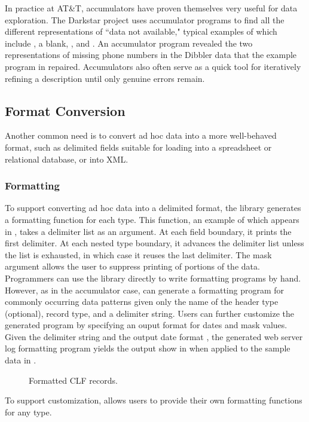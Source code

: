 \documentclass{sig-alternate}
\begin{document}
In practice at AT\&T, accumulators have proven themselves very useful for
data exploration.  The Darkstar project uses \pads{} accumulator programs
to find all the different representations of ``data not available,"  typical 
examples of which include , a blank, , and .
An accumulator program revealed the two representations
of missing phone numbers in the Dibbler data that the example program
in  repaired.
Accumulators also often serve as a quick tool for iteratively
refining a \pads{} description until only genuine errors remain.

\subsection{Format Conversion}
Another common need is to convert ad hoc data into a more well-behaved format, such as delimited fields suitable for loading into a spreadsheet or relational database, or into XML.  
\subsubsection{Formatting}
To support converting ad hoc data into a delimited format, the \pads{}
library generates a formatting function for each type.  This function,
an example of which appears in , takes a delimiter
list as an argument.  At each field boundary, it prints the first delimiter.
At each nested type boundary, it advances the delimiter list unless the list
is exhausted, in which case it reuses the last delimiter.  The mask argument
allows the user to suppress printing of portions of the data.  Programmers
can use the library directly to write formatting programs by hand.  However, 
as in the accumulator case, \pads{} can generate a formatting program for 
commonly occurring data patterns given only the name of the header type (optional), record type, and a delimiter string.  Users can further customize the generated program by specifying an ouput format for dates and mask values.   Given the delimiter
string  and the output date format , the generated
web server log formatting program yields
the output show in  when applied to the
sample data in . 
\begin{figure*}
\begin{small}
\begin{center}
\begin{code}

\end{code}
\label{figure:clf-records-formatted}
\caption{Formatted CLF records.}
\end{center}
\end{small}
\end{figure*}
To support customization, \pads{} allows users to provide their own formatting functions for any type.
\end{document}
